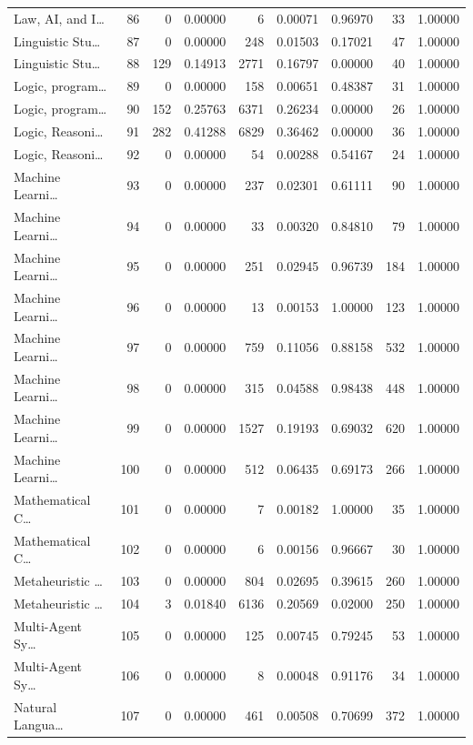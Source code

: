 \begin{table}
\begin{tabular}{lrrrrrrrr}
Law, AI, and I… & 86 & 0 & 0.00000 & 6 & 0.00071 & 0.96970 & 33 & 1.00000 \\
Linguistic Stu… & 87 & 0 & 0.00000 & 248 & 0.01503 & 0.17021 & 47 & 1.00000 \\
Linguistic Stu… & 88 & 129 & 0.14913 & 2771 & 0.16797 & 0.00000 & 40 & 1.00000 \\
Logic, program… & 89 & 0 & 0.00000 & 158 & 0.00651 & 0.48387 & 31 & 1.00000 \\
Logic, program… & 90 & 152 & 0.25763 & 6371 & 0.26234 & 0.00000 & 26 & 1.00000 \\
Logic, Reasoni… & 91 & 282 & 0.41288 & 6829 & 0.36462 & 0.00000 & 36 & 1.00000 \\
Logic, Reasoni… & 92 & 0 & 0.00000 & 54 & 0.00288 & 0.54167 & 24 & 1.00000 \\
Machine Learni… & 93 & 0 & 0.00000 & 237 & 0.02301 & 0.61111 & 90 & 1.00000 \\
Machine Learni… & 94 & 0 & 0.00000 & 33 & 0.00320 & 0.84810 & 79 & 1.00000 \\
Machine Learni… & 95 & 0 & 0.00000 & 251 & 0.02945 & 0.96739 & 184 & 1.00000 \\
Machine Learni… & 96 & 0 & 0.00000 & 13 & 0.00153 & 1.00000 & 123 & 1.00000 \\
Machine Learni… & 97 & 0 & 0.00000 & 759 & 0.11056 & 0.88158 & 532 & 1.00000 \\
Machine Learni… & 98 & 0 & 0.00000 & 315 & 0.04588 & 0.98438 & 448 & 1.00000 \\
Machine Learni… & 99 & 0 & 0.00000 & 1527 & 0.19193 & 0.69032 & 620 & 1.00000 \\
Machine Learni… & 100 & 0 & 0.00000 & 512 & 0.06435 & 0.69173 & 266 & 1.00000 \\
Mathematical C… & 101 & 0 & 0.00000 & 7 & 0.00182 & 1.00000 & 35 & 1.00000 \\
Mathematical C… & 102 & 0 & 0.00000 & 6 & 0.00156 & 0.96667 & 30 & 1.00000 \\
Metaheuristic … & 103 & 0 & 0.00000 & 804 & 0.02695 & 0.39615 & 260 & 1.00000 \\
Metaheuristic … & 104 & 3 & 0.01840 & 6136 & 0.20569 & 0.02000 & 250 & 1.00000 \\
Multi-Agent Sy… & 105 & 0 & 0.00000 & 125 & 0.00745 & 0.79245 & 53 & 1.00000 \\
Multi-Agent Sy… & 106 & 0 & 0.00000 & 8 & 0.00048 & 0.91176 & 34 & 1.00000 \\
Natural Langua… & 107 & 0 & 0.00000 & 461 & 0.00508 & 0.70699 & 372 & 1.00000 \\

\end{tabular}
\end{table}
